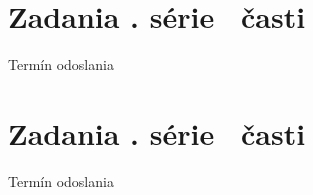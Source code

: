 \documentclass[12pt, twoside]{article}
\newcounter{task}
\begin{document}
            
    \loadRegularStyle
	\thispagestyle{first}
	\vspace*{3em}
    
	\newpage
	
	\newpage
   
    {
        \section{Zadania \currentSeries. série \currentPartGenitive\ časti}
		\centering
		\vspace{-1.3em}
        {Termín odoslania \currentDeadline}\\[2pt]
    } 
        
    \pagestyle{tasks}    
	\loadTasksStyle
    \addTasks                
	\newpage	
	{
        \section{Zadania \currentSeries. série \currentPartGenitive\ časti}
		\centering
		\vspace{-1.3em}
        {Termín odoslania \currentDeadline}\\[2pt]
    }
    \addTasks 
\end{document}
